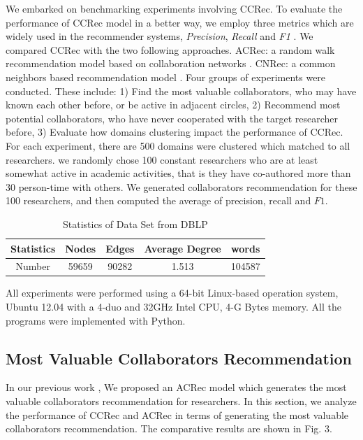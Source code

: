 \documentclass[review]{elsarticle}
\begin{document}
We embarked on benchmarking experiments involving CCRec. To evaluate the performance of CCRec model in a better way, we employ three metrics which are widely used in the recommender systems, \emph{Precision}, \emph{Recall} and \emph{F1} \cite{shani2011evaluating}. We compared CCRec with the two following approaches. ACRec: a random walk recommendation model based on collaboration networks \cite{li2014acrec}. CNRec: a common neighbors based recommendation model \cite{lopes2010collaboration}. Four groups of experiments were conducted. These include: 1) Find the most valuable collaborators, who may have known each other before, or be active in adjacent circles, 2) Recommend most potential collaborators, who have never cooperated with the target researcher before, 3) Evaluate how domains clustering impact the performance of CCRec. For each experiment, there are 500 domains were clustered which matched to all researchers. we randomly chose 100 constant researchers who are at least somewhat active in academic activities, that is they have co-authored more than 30 person-time with others. We generated collaborators recommendation for these 100 researchers, and then computed the average of precision, recall and $F1$.

\begin{table}
\renewcommand{\arraystretch}{1.2}
\centering
\caption{Statistics of Data Set from DBLP}
\begin{tabular}{|c|c|c|c|c|} \hline
Statistics &Nodes&Edges&Average Degree&words\\ \hline
Number & 59659 &90282 &1.513 &104587\\
\hline\end{tabular}
\end{table}

All experiments were performed using a 64-bit Linux-based operation system, Ubuntu 12.04 with a 4-duo and 32GHz Intel CPU, 4-G Bytes memory. All the programs were implemented with Python.

\subsection{Most Valuable Collaborators Recommendation}
In our previous work \cite{li2014acrec}, We proposed an ACRec model which generates the most valuable collaborators recommendation for researchers. In this section, we analyze the performance of CCRec and ACRec in terms of generating the most valuable collaborators recommendation. The comparative results are shown in Fig. 3.
\end{document}
